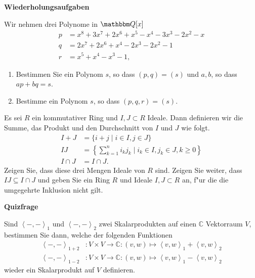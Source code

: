 \documentclass[a4,11pt]{article}
\begin{document}
\newpage
\bigskip
{\Large \bfseries Wiederholungsaufgaben}
\bigskip

\begin{aufgabe}
Wir nehmen drei Polynome in $\Q[x]$
\begin{align*}
p &= x^8 + 3x^7 + 2x^6 + x^5 - x^4 - 3x^3 - 2x^2 - x\\
q &= 2x^7 + 2x^6 + x^4 - 2x^3 - 2x^2 - 1\\
r &= x^5 + x^4 - x^3 - 1,
\end{align*}
\begin{enumerate}
\item
  Bestimmen Sie ein Polynom $s$, so dass $(p,q) = (s)$
  und $a,b$, so dass $ap+bq=s$.
\item
  Bestimme ein Polynom $s$, so dass $(p,q,r) = (s)$.
 \end{enumerate}
\end{aufgabe}

\begin{aufgabe}

Es sei $R$ ein kommutativer Ring und $I, J \subset R$ Ideale. Dann
definieren wir die Summe, das Produkt und den Durchschnitt von $I$ und
$J$ wie folgt.
\begin{align*}
I + J &= \{ i + j \mid i \in I, j \in J \}\\
IJ &= \left\{ \sum_{k = 1}^n i_k j_k \mid i_k \in I, j_k \in J, k \geq 0 \right\}\\
I \cap J &= I \cap J.
\end{align*}
Zeigen Sie, dass diese drei Mengen Ideale von $R$ sind. Zeigen Sie
weiter, dass $IJ \subseteq I \cap J$ und geben Sie ein Ring $R$ und
Ideale $I, J \subset R$ an, f"ur die die umgegehrte Inklusion nicht gilt.  
\end{aufgabe}


\newpage
\bigskip
{\Large \bfseries Quizfrage}
\bigskip

Sind $\left<-,-\right>_1$ und $\left<-,-\right>_2$ zwei Skalarprodukten auf einen $\mathbb{C}$ Vektorraum $V$, bestimmen Sie dann, welche der folgenden Funktionen 
\begin{align*}
\left<-,-\right>_{1 + 2} &: V \times V \rightarrow \mathbb{C} : (v, w) \mapsto \left<v,w\right>_1 + \left<v,w\right>_2\\
\left<-,-\right>_{1 - 2} &: V \times V \rightarrow \mathbb{C} : (v, w) \mapsto \left<v,w\right>_1 - \left<v,w\right>_2
\end{align*}
wieder ein Skalarprodukt auf $V$ definieren.
\end{document}
